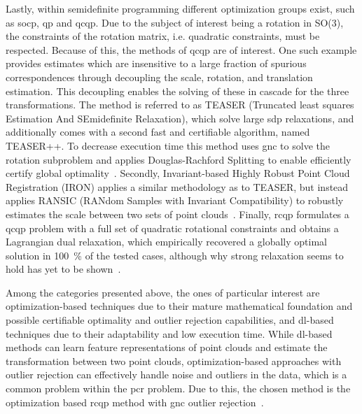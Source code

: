 Lastly, within semidefinite programming different optimization groups exist, such as \gls{socp}, \gls{qp} and \gls{qcqp}. Due to the subject of interest being a rotation in SO(\num{3}), the constraints of the rotation matrix, i.e. quadratic constraints, must be respected. Because of this, the methods of \gls{qcqp} are of interest. \medskip
One such example provides estimates which are insensitive to a large fraction of spurious correspondences through decoupling the scale, rotation, and translation estimation. This decoupling enables the solving of these in cascade for the three transformations. The method is referred to as TEASER (Truncated least squares Estimation And SEmidefinite Relaxation), which solve large \gls{sdp} relaxations, and additionally comes with a second fast and certifiable algorithm, named TEASER++. To decrease execution time this method uses \gls{gnc} to solve the rotation subproblem and applies Douglas-Rachford Splitting to enable efficiently certify global optimality~\cite{teaser:-fast-and-certifiable-point-cloud-registration}. Secondly, Invariant-based Highly Robust Point Cloud Registration (IRON) applies a similar methodology as to TEASER, but instead applies RANSIC (RANdom Samples with Invariant Compatibility) to robustly estimates the scale between two sets of point clouds~\cite{iron:-invariant-based-highly-robust-point-cloud-registration}. Finally, \gls{rcqp} formulates a \gls{qcqp} problem with a full set of quadratic rotational constraints and obtains a Lagrangian dual relaxation, which empirically recovered a globally optimal solution in \SI{100}{\percent} of the tested cases, although why strong relaxation seems to hold has yet to be shown~\cite{convex-global-3d-registration-with-lagrangian-duality}. \medskip

Among the categories presented above, the ones of particular interest are optimization-based techniques due to their mature mathematical foundation and possible certifiable optimality and outlier rejection capabilities, and \gls{dl}-based techniques due to their adaptability and low execution time. While \gls{dl}-based methods can learn feature representations of point clouds and estimate the transformation between two point clouds, optimization-based approaches with outlier rejection can effectively handle noise and outliers in the data, which is a common problem within the \gls{pcr} problem. Due to this, the chosen method is the optimization based \gls{rcqp} method with \gls{gnc} outlier rejection~\cite{graduated-non-convexity-for-robust-spatial-perception:-from-non-minimal-solvers-to-global-outlier-rejection}.


